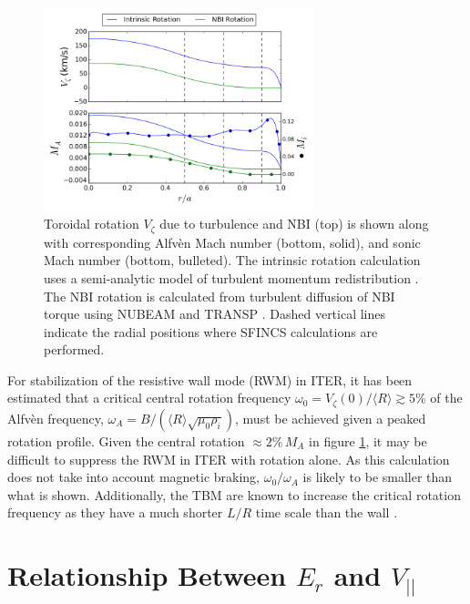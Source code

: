 \documentclass{article}
\numberwithin{figure}{section}
\numberwithin{equation}{section}
\begin{document}
\begin{figure}[h!]
\centering
\includegraphics[width=0.7\textwidth]{rotationestimate.png}
\caption{\label{fig:rotation_estimate} Toroidal rotation $V_{\zeta}$ due to turbulence and NBI (top) is shown along with  corresponding Alfv\`{e}n Mach number (bottom, solid), and sonic Mach number (bottom, bulleted). The intrinsic rotation calculation uses a semi-analytic model of turbulent momentum redistribution \cite{Hillesheim2015}. The NBI rotation is calculated from turbulent diffusion of NBI torque using NUBEAM and TRANSP \cite{Poli2014}. Dashed vertical lines indicate the radial positions where SFINCS calculations are performed. }
\end{figure}

For stabilization of the resistive wall mode (RWM) in ITER, it has been estimated that a critical central rotation frequency $\omega_0 = V_{\zeta}(0)/\langle R \rangle \gtrsim 5\%$ of the Alfv\`{e}n frequency, $\omega_A = B/(\langle R\rangle\sqrt{\mu_0 \rho_i})$, must be achieved given a peaked rotation profile. Given the central rotation $\approx 2\% \, M_A$ in figure \ref{fig:rotation_estimate}, it may be difficult to suppress the RWM in ITER with rotation alone. As this calculation does not take into account magnetic braking, $\omega_0/\omega_A$ is likely to be smaller than what is shown. Additionally, the TBM are known to increase the critical rotation frequency as they have a much shorter $L/R$ time scale than the wall \cite{Liu2004}.

\FloatBarrier

\section{Relationship Between $E_r$ and $V_{||}$}\label{Erandv}
\end{document}
